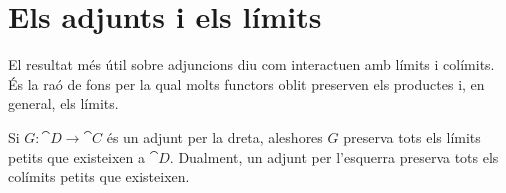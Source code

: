 \section{Els adjunts i els límits}

El resultat més útil sobre adjuncions diu com interactuen amb límits i colímits. És la raó de fons per la qual molts functors oblit preserven els productes i, en general, els límits.

\begin{teorema}
\label{teo:adjunts-preserven-limits}
Si $G\colon\cat{D}\to\cat{C}$ és un adjunt per la dreta, aleshores $G$ preserva tots els límits petits que existeixen a $\cat{D}$. Dualment, un adjunt per l'esquerra preserva tots els colímits petits que existeixen.
\end{teorema}

